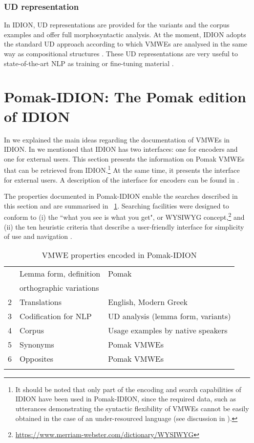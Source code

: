 \documentclass[output=paper,colorlinks,citecolor=brown]{langscibook}
\begin{document}
\subsubsection{UD representation}
\label{sec:desud}

In IDION, UD representations are provided for the variants and the corpus examples and  offer full morphosyntactic analysis.   At the moment, IDION adopts the standard UD approach according to which  VMWEs are analysed in the same way as compositional structures \citep[281]{UD}. These UD representations are very useful to state-of-the-art NLP as training or fine-tuning material \citep{savary-etal-2019-without}. 


\section{Pomak-IDION: The Pomak edition of IDION}
\label{sec:idionpomak}

Ιn  we explained the main ideas regarding the documentation of VMWEs in IDION. In   we mentioned that IDION has two interfaces: one for encoders and one for external users.  This section presents the information on Pomak VMWEs that can be retrieved from IDION.\footnote{It should be noted that only part of the encoding and search capabilities of IDION have been used in Pomak-IDION, since the required data, such as utterances demonstrating the syntactic flexibility of VMWEs cannot be easily obtained in the case of an under-resourced language (see discussion in ).} At the same time, it presents the interface for external users. A description of the interface for encoders can be found in \citet{markantonatou-etal-2019-idion}. 


The properties documented in Pomak-IDION enable the searches described in this section and are summarised in \tablename~\ref{tab:tablepomak}.
Searching facilities were designed to conform to  (i)  the ``what you see is what you get", or WYSIWYG concept,\footnote{\url{https://www.merriam-webster.com/dictionary/WYSIWYG}} and (ii) the ten heuristic criteria that describe a user-friendly interface for simplicity of use and navigation \citep{nielsen}.



\begin{table}[hbt!]
\centering
\begin{tabular}{lll}
\lsptoprule 
1 & Lemma form, definition & Pomak \\
 & orthographic variations &   \\
2 & Translations &  English, Modern Greek  \\
3 & Codification for NLP &  UD analysis (lemma form,  variants)\\
4 & Corpus & Usage examples by native speakers  \\
5 & Synonyms & Pomak VMWEs \\
6 & Opposites & Pomak VMWEs \\
\lspbottomrule
\end{tabular}
\caption{VMWE properties encoded in Pomak-IDION}
\label{tab:tablepomak}
\end{table}
\end{document}
